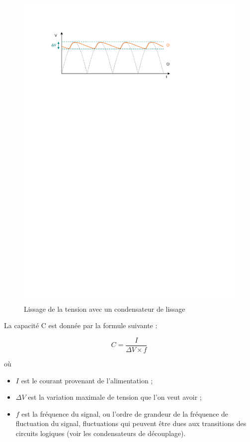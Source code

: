 \documentclass[a4paper]{article}
\begin{document}
\begin{figure}[H]
	\centering
	\includegraphics[scale=1.00]{Images/Condensateur_de_lissage}
	\caption{Lissage de la tension avec un condensateur de lissage
		\label{Condensateur_de_lissage}}
\end{figure}

La capacité C est donnée par la formule suivante :

\[C = \frac{I}{\Delta{}V \times f}\]

où

\begin{itemize}
	\item $I$ est le courant provenant de l'alimentation ;
	\item $\Delta{}V$ est la variation maximale de tension que l'on veut avoir ;
	\item $f$ est la fréquence du signal, ou l'ordre de grandeur de la fréquence de fluctuation du signal, fluctuations qui peuvent être dues aux transitions des circuits logiques (voir les condensateurs de découplage).
\end{itemize}
\end{document}
